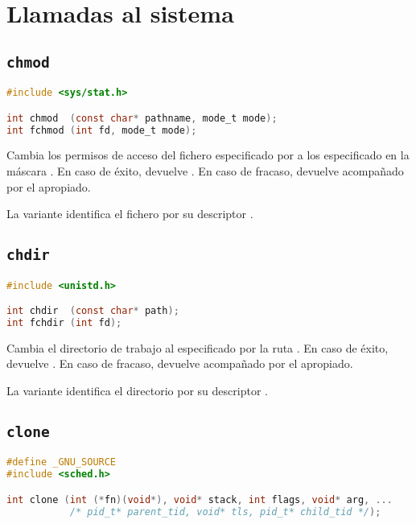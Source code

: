 \chapter{Llamadas al sistema}

\section{\texttt{chmod}}\label{chmod}

\begin{lstlisting}[language=C]
#include <sys/stat.h>

int chmod  (const char* pathname, mode_t mode);
int fchmod (int fd, mode_t mode);
\end{lstlisting}

Cambia los permisos de acceso del fichero especificado por  a los especificado en la máscara .
En caso de éxito, devuelve .
En caso de fracaso, devuelve  acompañado por el  apropiado.

La variante  identifica el fichero por su descriptor .

\section{\texttt{chdir}}\label{chdir}

\begin{lstlisting}[language=C]
#include <unistd.h>

int chdir  (const char* path);
int fchdir (int fd);
\end{lstlisting}

Cambia el directorio de trabajo al especificado por la ruta .
En caso de éxito, devuelve .
En caso de fracaso, devuelve  acompañado por el  apropiado.

La variante  identifica el directorio por su descriptor .

\section{\texttt{clone}}\label{clone}

\begin{lstlisting}[language=C]
#define _GNU_SOURCE
#include <sched.h>

int clone (int (*fn)(void*), void* stack, int flags, void* arg, ...
           /* pid_t* parent_tid, void* tls, pid_t* child_tid */);
\end{lstlisting}

